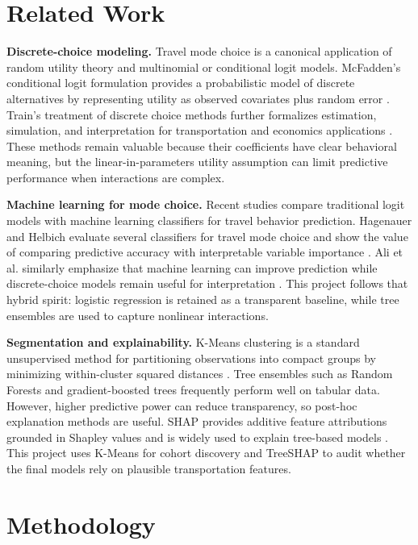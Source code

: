 \documentclass{article}
\begin{document}
\section{Related Work}
\textbf{Discrete-choice modeling.}  Travel mode choice is a canonical application of random utility theory and multinomial or conditional logit models.  McFadden's conditional logit formulation provides a probabilistic model of discrete alternatives by representing utility as observed covariates plus random error \citep{mcfadden1974}.  Train's treatment of discrete choice methods further formalizes estimation, simulation, and interpretation for transportation and economics applications \citep{train2009}.  These methods remain valuable because their coefficients have clear behavioral meaning, but the linear-in-parameters utility assumption can limit predictive performance when interactions are complex.

\textbf{Machine learning for mode choice.}  Recent studies compare traditional logit models with machine learning classifiers for travel behavior prediction.  Hagenauer and Helbich evaluate several classifiers for travel mode choice and show the value of comparing predictive accuracy with interpretable variable importance \citep{hagenauer2017}.  Ali et al. similarly emphasize that machine learning can improve prediction while discrete-choice models remain useful for interpretation \citep{ali2021}.  This project follows that hybrid spirit: logistic regression is retained as a transparent baseline, while tree ensembles are used to capture nonlinear interactions.

\textbf{Segmentation and explainability.}  K-Means clustering is a standard unsupervised method for partitioning observations into compact groups by minimizing within-cluster squared distances \citep{lloyd1982}.  Tree ensembles such as Random Forests \citep{breiman2001} and gradient-boosted trees \citep{chen2016xgboost} frequently perform well on tabular data.  However, higher predictive power can reduce transparency, so post-hoc explanation methods are useful.  SHAP provides additive feature attributions grounded in Shapley values and is widely used to explain tree-based models \citep{lundberg2017}.  This project uses K-Means for cohort discovery and TreeSHAP to audit whether the final models rely on plausible transportation features.

\section{Methodology}
\end{document}
